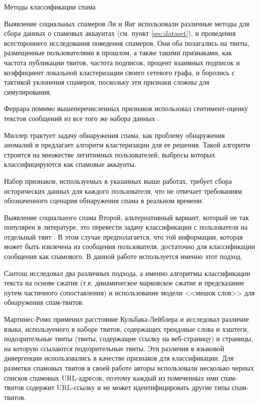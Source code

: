 \begin{section}{Методы классификации спама}
\begin{subsection}{Выявление социальных спамеров}
  Ли \cite{Lee} и Янг \cite{Yang} использовали различные методы для сбора данных о  спамовых аккаунтах (см. пункт \ref{sec:dataset}),
  и проведения всестороннего исследования поведения спамеров. Они оба полагались на твиты, размещенные пользователями в прошлом,
  а также такими признаками, как частота публикации твитов, частота подписок, процент взаимных подписок и коэффициент локальной кластеризации своего сетевого графа, и боролись с тактикой уклонения спамеров, поскольку эти признаки сложны для симулирования.

  Феррара \cite{Ferrara} помимо вышеперечисленных признаков использовал сентимент-оценку текстов сообщений из все того же набора данных \cite{Lee}.

  Миллер \cite{Miller} трактует задачу обнаружения спама, как проблему обнаружения аномалий и предлагает алгоритм кластеризации для ее решения.
  Такой алгоритм строится на множестве легитимных пользователей, выбросы которых классифицируются как спамовые аккаунты.

  Набор признаков, используемых в указанных выше работах, требует сбора исторических данных для каждого пользователя, что не отвечает требованиям обозначенного сценария обнаружения спама в реальном времени.
\end{subsection}

\begin{subsection}{Выявление социального спама}
Второй, альтернативный вариант, который не так популярен в литературе,
это перевести задачу классификации с пользователя на отдельный твит \cite{Benevenuto}.
В этом случае предполагается, что той информации, которая может быть извлечена из сообщения пользователя,
достаточно для классификации сообщения как спамового. В данной работе используется именно этот подход.

Сантош \cite{Santos} исследовал два различных подхода, а именно алгоритмы классификации текста на основе сжатия (т.е. динамическое марковское сжатие и предсказание путем частичного сопоставления) и использование модели <<мешок слов>> для обнаружения спам-твитов.

Мартинес-Ромо \cite{Martinez} применил расстояние Кульбака-Лейблера и исследовал различие языка, используемого в наборе твитов, содержащих трендовые слова и хэштеги, подозрительные твиты (твиты, содержащие ссылку на веб-страницу) и страницы, на которую ссылаются подозрительные твиты.
Эти различия в языковой дивергенции использовались в качестве признаков для классификации.
Для разметки спамовых твитов в своей работе авторы использовали несколько черных списков спамовых URL-адресов, поэтому каждый из помеченных ими спам-твитов содержит URL-ссылку и не может идентифицировать другие типы спам-твитов.


\end{subsection}
\end{section}
